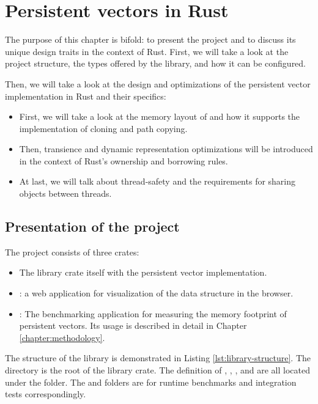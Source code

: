 \chapter{Persistent vectors in Rust}
\label{chapter:persistent-vectors-in-rust}
The purpose of this chapter is bifold: to present the \pvecrs{} project and to discuss its unique design traits in the context of Rust. First, we will take a look at the project structure, the types offered by the library, and how it can be configured.

Then, we will take a look at the design and optimizations of the persistent vector implementation in Rust and their specifics:

\begin{itemize}
    \item First, we will take a look at the memory layout of \rrbtree{} and how it supports the implementation of cloning and path copying.
    \item Then, transience and dynamic representation optimizations will be introduced in the context of Rust's ownership and borrowing rules.
    \item At last, we will talk about thread-safety and the requirements for sharing objects between threads.
\end{itemize}

\section{Presentation of the project}
The \pvecrs{} project consists of three crates:
\begin{itemize}
    \item The library crate itself with the persistent vector implementation.
    \item {}: a web application for visualization of the data structure in the browser.
    \item {}: The benchmarking application for measuring the memory footprint of persistent vectors. Its usage is described in detail in Chapter \ref{chapter:methodology}.
\end{itemize}

The structure of the library is demonstrated in Listing \ref{lst:library-structure}. The  directory is the root of the library crate. The definition of \rrbtree{}, \rbvec{}, \rrbvec{}, and \pvec{} are all located under the  folder. The  and  folders are for runtime benchmarks and integration tests correspondingly.

